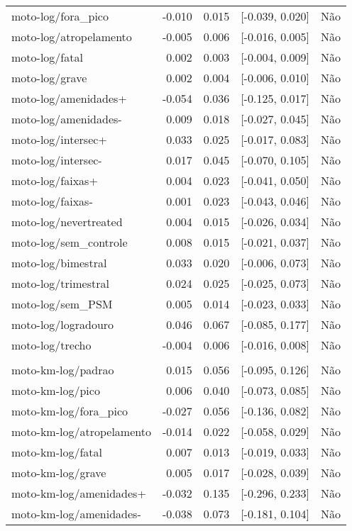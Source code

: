 \begin{longtable}{lrrcl}
moto-log/fora\_pico & -0.010 & 0.015 & {}[-0.039, 0.020] & Não\\
moto-log/atropelamento & -0.005 & 0.006 & {}[-0.016, 0.005] & Não\\
moto-log/fatal & 0.002 & 0.003 & {}[-0.004, 0.009] & Não\\
moto-log/grave & 0.002 & 0.004 & {}[-0.006, 0.010] & Não\\
moto-log/amenidades+ & -0.054 & 0.036 & {}[-0.125, 0.017] & Não\\
moto-log/amenidades- & 0.009 & 0.018 & {}[-0.027, 0.045] & Não\\
moto-log/intersec+ & 0.033 & 0.025 & {}[-0.017, 0.083] & Não\\
moto-log/intersec- & 0.017 & 0.045 & {}[-0.070, 0.105] & Não\\
moto-log/faixas+ & 0.004 & 0.023 & {}[-0.041, 0.050] & Não\\
moto-log/faixas- & 0.001 & 0.023 & {}[-0.043, 0.046] & Não\\
moto-log/nevertreated & 0.004 & 0.015 & {}[-0.026, 0.034] & Não\\
moto-log/sem\_controle & 0.008 & 0.015 & {}[-0.021, 0.037] & Não\\
moto-log/bimestral & 0.033 & 0.020 & {}[-0.006, 0.073] & Não\\
moto-log/trimestral & 0.024 & 0.025 & {}[-0.025, 0.073] & Não\\
moto-log/sem\_PSM & 0.005 & 0.014 & {}[-0.023, 0.033] & Não\\
moto-log/logradouro & 0.046 & 0.067 & {}[-0.085, 0.177] & Não\\
moto-log/trecho & -0.004 & 0.006 & {}[-0.016, 0.008] & Não\\
 &  &  &  & \\
moto-km-log/padrao & 0.015 & 0.056 & {}[-0.095, 0.126] & Não\\
moto-km-log/pico & 0.006 & 0.040 & {}[-0.073, 0.085] & Não\\
moto-km-log/fora\_pico & -0.027 & 0.056 & {}[-0.136, 0.082] & Não\\
moto-km-log/atropelamento & -0.014 & 0.022 & {}[-0.058, 0.029] & Não\\
moto-km-log/fatal & 0.007 & 0.013 & {}[-0.019, 0.033] & Não\\
moto-km-log/grave & 0.005 & 0.017 & {}[-0.028, 0.039] & Não\\
moto-km-log/amenidades+ & -0.032 & 0.135 & {}[-0.296, 0.233] & Não\\
moto-km-log/amenidades- & -0.038 & 0.073 & {}[-0.181, 0.104] & Não\\

\end{longtable}
